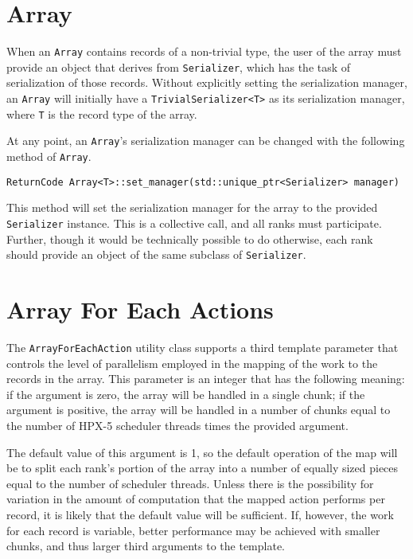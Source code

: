 \section{Array}

When an \texttt{Array} contains records of a non-trivial type, the user of
the array must provide an object that derives from \texttt{Serializer}, which
has the task of serialization of those records. Without explicitly setting the
serialization manager, an \texttt{Array} will initially have a
\texttt{TrivialSerializer<T>} as its serialization manager, where \texttt{T} 
is the record type of the array.

At any point, an \texttt{Array}'s serialization manager can be changed with 
the following method of \texttt{Array}.

\begin{lstlisting}
ReturnCode Array<T>::set_manager(std::unique_ptr<Serializer> manager)
\end{lstlisting} 

\noindent This method will set the serialization manager for the array to the 
provided \texttt{Serializer} instance. This is a collective call, and all ranks
must participate. Further, though it would be technically possible to do 
otherwise, each rank should provide an object of the same subclass of 
\texttt{Serializer}.

\noindent

\section{Array For Each Actions}

The \texttt{ArrayForEachAction} utility class supports a third template
parameter that controls the level of parallelism employed in the mapping of
the work to the records in the array. This parameter is an integer that has the
following meaning: if the argument is zero, the array will be handled in a
single chunk; if the argument is positive, the array will be handled in a
number of chunks equal to the number of HPX-5 scheduler threads times the
provided argument.

The default value of this argument is 1, so the default operation of
the map will be to split each rank's portion of the array into a number of
equally sized pieces equal to the number of scheduler threads. Unless there is
the possibility for variation in the amount of computation that the mapped
action performs per record, it is likely that the default value will be
sufficient. If, however, the work for each record is variable, better
performance may be achieved with smaller chunks, and thus larger third
arguments to the template.

